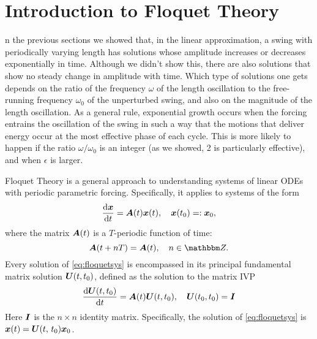 \documentclass[10pt,letter, swedish, english,%
]{article}
\newcommand{\I}{{\mathbfrm{I}}}
\begin{document}





\section{Introduction to Floquet Theory}
n the previous sections we showed that, in the linear approximation, a
swing with periodically varying length has solutions whose amplitude
increases or decreases exponentially in time. Although we didn’t show
this, there are also solutions that show no steady change in amplitude
with time. Which type of solutions one gets depends on the ratio of
the frequency $\omega$ of the length oscillation to the free-running
frequency $\omega_0$ of the unperturbed swing, and also on the magnitude  of the
length oscillation. As a general rule, exponential growth occurs when
the forcing entrains the oscillation of the swing in such a way that
the motions that deliver energy occur at the most effective phase of
each cycle. This is more likely to happen if the ratio $\omega/\omega_0$ is an integer
(as we showed, 2 is particularly effective), and when $\epsilon$ is larger.  

Floquet Theory is a general approach to understanding systems of
linear ODEs with periodic parametric forcing. Specifically, it applies
to systems of the form 
\begin{equation}\label{eq:floquetsys}%
\dv{\vb{x}}{t}=\vb{A}(t)\vb{x}(t)
\qcomma \vb{x}(t_0)=:\vb{x}_0,
\end{equation}
where the matrix $\vb{A}(t)$ is a $T$-periodic function of time: 
\begin{equation}\label{eq:2}
\vb{A}(t+nT)=\vb{A}(t)\qcomma
n\in\Z.
\end{equation}
Every solution of \eqref{eq:floquetsys} is encompassed in its principal
fundamental matrix solution $\vb{U}(t,t_0)$, defined as the solution
to the matrix IVP  
\begin{equation}
\dv{\vb{U}(t,t_0)}{t}=\vb{A}(t)\vb{U}(t,t_0)\qcomma
\vb{U}(t_0,t_0)=\I
\end{equation}
Here  $\I$ is the  $n\times n$ identity matrix. Specifically, the
solution of \eqref{eq:floquetsys} is  $\vb{x}(t)=\vb{U}(t,\,{t}_{0})\vb{x}_{0}$.
\end{document}
